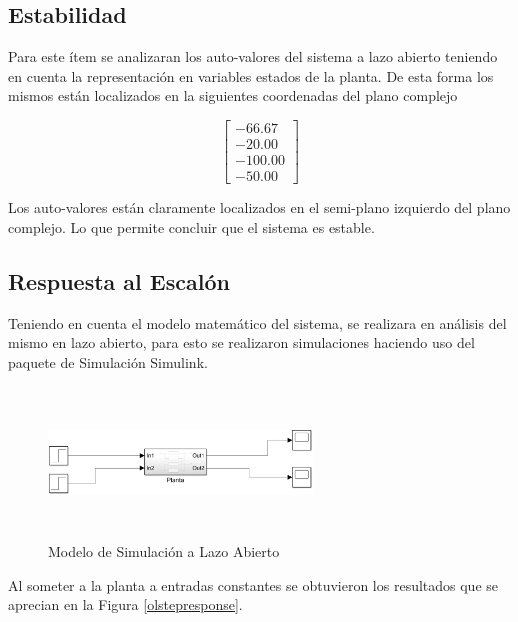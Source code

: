 \documentclass[journal,twoside,web]{ieeecolor}
\begin{document}
	\subsection{Estabilidad}
		
		Para este ítem se analizaran los auto-valores del sistema a lazo abierto teniendo en cuenta la representación en variables estados de la planta. De esta forma los mismos están localizados en la siguientes coordenadas del plano complejo
		
		\begin{equation}
			\begin{bmatrix}
				-66.67 \\
				-20.00 \\
				-100.00 \\
				-50.00
			\end{bmatrix}
		\end{equation}
		
		Los auto-valores están claramente localizados en el semi-plano izquierdo del plano complejo. Lo que permite concluir que el sistema es estable.		
		
	\subsection{Respuesta al Escalón}
	
	Teniendo en cuenta el modelo matemático del sistema, se realizara en análisis del mismo en lazo abierto, para esto se realizaron simulaciones haciendo uso 
	del paquete de Simulación Simulink.
	
	\begin{figure}[h]
		\begin{center}
			\includegraphics[width=7cm,height=4cm,keepaspectratio]{modelsimulink}
			\caption{Modelo de Simulación a Lazo Abierto\label{modelsimulink}}
		\end{center}
	\end{figure}
	
	Al someter a la planta a entradas constantes se obtuvieron los resultados que se aprecian en la Figura \ref{olstepresponse}.
	
\end{document}
